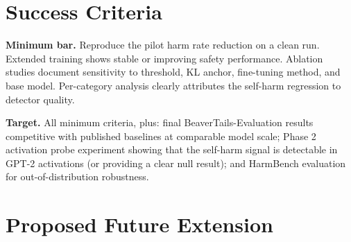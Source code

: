\documentclass[a4paper,twoside,12pt]{report}
\begin{document}
\begin{table}[ht]
  \centering
  \caption{Target results table for thesis. [TBD] entries are planned experiments.}
  \label{tab:target}
\end{table}

\section{Success Criteria}

\textbf{Minimum bar.} Reproduce the pilot harm rate reduction on a clean run. Extended
training shows stable or improving safety performance. Ablation studies document sensitivity
to threshold, KL anchor, fine-tuning method, and base model. Per-category analysis clearly
attributes the self-harm regression to detector quality.

\textbf{Target.} All minimum criteria, plus: final BeaverTails-Evaluation results
competitive with published baselines at comparable model scale; Phase 2 activation probe
experiment showing that the self-harm signal is detectable in GPT-2 activations (or
providing a clear null result); and HarmBench \citep{mazeika2024} evaluation for
out-of-distribution robustness.

\section{Proposed Future Extension}
\end{document}
